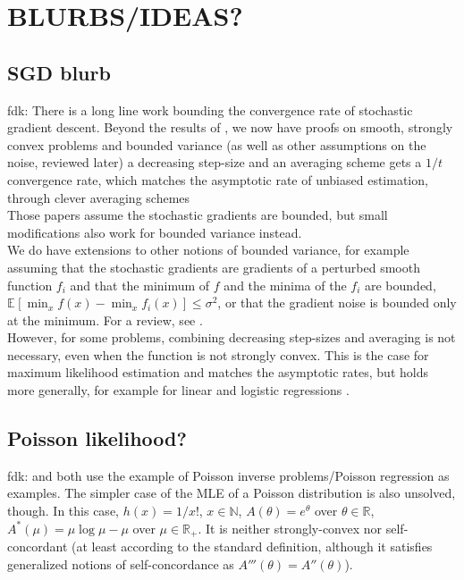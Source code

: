 \documentclass[twoside]{article}
\let\oldsection\section
\renewcommand{\section}[1]{\oldsection{\texorpdfstring{\uppercase{#1}}{#1}}}
\newcommand{\fdk}[1]{\textcolor{Periwinkle}{fdk:#1}}
\newcommand*{\expect}[2][]{\ensuremath{\mathbb{E}_{#1} \left[ #2 \right] }} %
\begin{document}
\section{Blurbs/ideas?}



\subsection{SGD blurb}
\fdk{
%
There is a long line work bounding the convergence rate of stochastic gradient descent.
Beyond the results of \citet{robbins1951stochastic}, 
we now have proofs on smooth, strongly convex problems and bounded variance 
(as well as other assumptions on the noise, reviewed later)
a decreasing step-size and an averaging scheme gets 
a $1/t$ convergence rate, 
which matches the asymptotic rate of unbiased estimation,
through clever averaging schemes \citep{rakhlin2012making,lacostejulien2012simpler} 
\\
Those papers assume the stochastic gradients are bounded, 
but small modifications also work for bounded variance instead.
\\
We do have extensions to other notions of bounded variance, 
for example assuming that the stochastic gradients are gradients of a perturbed smooth function $f_i$ 
and that the minimum of $f$ and the minima of the $f_i$ 
are bounded, $\expect{\min_x f(x) - \min_x f_i(x)} \leq \sigma^2$,
or that the gradient noise is bounded only at the minimum. 
For a review, see \citet{gower2019sgd}.
\\
However, for some problems, combining decreasing step-sizes and averaging is not necessary,
even when the function is not strongly convex.
This is the case for maximum likelihood estimation and matches the asymptotic rates, 
but holds more generally, for example for linear and logistic regressions \citep{bach2013nonstronglyconvex,moulines2011non}.
}


\subsection{Poisson likelihood?}
\fdk{
\citet{bauschke2017descent} and \citet{hanzely2018fastest} both use the example of Poisson inverse problems/Poisson regression
as examples. 
The simpler case of the MLE of a Poisson distribution is also unsolved, though. 
In this case, $h(x) = 1/x!$, $x \in \mathbb{N}$, $A(\theta) = e^\theta$ over $\theta \in \mathbb{R}$,
$A^*(\mu) = \mu \log \mu - \mu$ over $\mu \in \mathbb{R}_+$.
It is neither strongly-convex nor self-concordant (at least according to the standard definition, 
although it satisfies generalized notions of self-concordance as $A'''(\theta) = A''(\theta)$).
}
\end{document}
